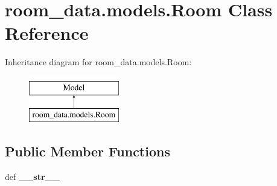 \hypertarget{classroom__data_1_1models_1_1_room}{\section{room\-\_\-data.\-models.\-Room Class Reference}
\label{classroom__data_1_1models_1_1_room}
}
Inheritance diagram for room\-\_\-data.\-models.\-Room\-:\begin{figure}[H]
\begin{center}
\leavevmode
\includegraphics[height=2.000000cm]{classroom__data_1_1models_1_1_room}
\end{center}
\end{figure}
\subsection*{Public Member Functions}
\begin{DoxyCompactItemize}
\item 
\hypertarget{classroom__data_1_1models_1_1_room_adf410d3fb8402a17f0601568c781e33b}{def {\bfseries \-\_\-\-\_\-str\-\_\-\-\_\-}}\label{classroom__data_1_1models_1_1_room_adf410d3fb8402a17f0601568c781e33b}

\end{DoxyCompactItemize}
